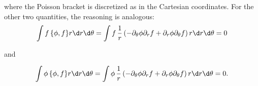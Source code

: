 where the Poisson bracket is discretized as in the Cartesian coordinates. For the other two quantities, the reasoning is analogous:
\begin{equation*}
\int f \, \{{\phi, f}\} r \d r \d \theta = \int f \, \frac{1}{r} \left(-\partial_\theta \phi \partial_r f + \partial_r \phi \partial_\theta f \right) r \d r \d \theta= 0
\end{equation*}

and

\begin{equation*}
\int \phi \, \{{\phi, f}\} r \d r \d \theta = \int \phi \, \frac{1}{r} \left(-\partial_\theta \phi \partial_r f + \partial_r \phi \partial_\theta f \right) r \d r \d \theta = 0 .
\end{equation*}


